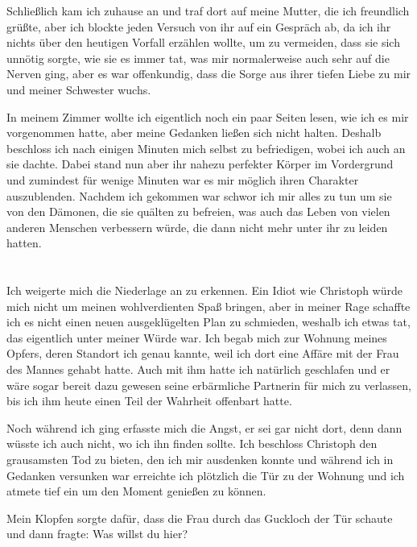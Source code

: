 \documentclass[11pt, a5paper]{article}
\newcommand{\e}{Christoph }
\newcommand{\te}{Jane } %
\begin{document}
\begin{spacing}{1.2}
		Schließlich kam ich zuhause an und traf dort auf meine Mutter, die ich freundlich grüßte, aber ich blockte jeden Versuch von ihr auf ein Gespräch ab, da ich ihr nichts über den heutigen Vorfall erzählen wollte, um zu vermeiden, dass sie sich unnötig sorgte, wie sie es immer tat, was mir normalerweise auch sehr auf die Nerven ging, aber es war offenkundig, dass die Sorge aus ihrer tiefen Liebe zu mir und meiner Schwester wuchs.
		
		In meinem Zimmer wollte ich eigentlich noch ein paar Seiten lesen, wie ich es mir vorgenommen hatte, aber meine Gedanken ließen sich nicht halten. Deshalb beschloss ich nach einigen Minuten mich selbst zu befriedigen, wobei ich auch an sie dachte. Dabei stand nun aber ihr nahezu perfekter Körper im Vordergrund und zumindest für wenige Minuten war es mir möglich ihren Charakter auszublenden. Nachdem ich gekommen war schwor ich mir alles zu tun um sie von den Dämonen, die sie quälten zu befreien, was auch das Leben von vielen anderen Menschen verbessern würde, die dann nicht mehr unter ihr zu leiden hatten.\newpage
		
		\section{}
		Ich weigerte mich die Niederlage an zu erkennen. Ein Idiot wie \e würde mich nicht um meinen wohlverdienten Spaß bringen, aber in meiner Rage schaffte ich es nicht einen neuen ausgeklügelten Plan zu schmieden, weshalb ich etwas tat, das eigentlich unter meiner Würde war. Ich begab mich zur Wohnung meines Opfers, deren Standort ich genau kannte, weil ich dort eine Affäre mit der Frau des Mannes gehabt hatte. Auch mit ihm hatte ich natürlich geschlafen und er wäre sogar bereit dazu gewesen seine erbärmliche Partnerin für mich zu verlassen, bis ich ihm heute einen Teil der Wahrheit offenbart hatte.
		
		Noch während ich ging erfasste mich die Angst, er sei gar nicht dort, denn dann wüsste ich auch nicht, wo ich ihn finden sollte. Ich beschloss \e den grausamsten Tod zu bieten, den ich mir ausdenken konnte und während ich in Gedanken versunken war erreichte ich plötzlich die Tür zu der Wohnung und ich atmete tief ein um den Moment genießen zu können.
		
		Mein Klopfen sorgte dafür, dass die Frau durch das Guckloch der Tür schaute und dann fragte: \frqq Was willst du hier?\flqq
		

\end{spacing}
\end{document}
